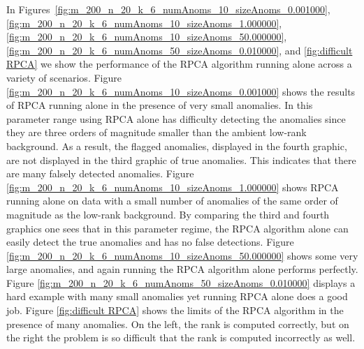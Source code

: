 \documentclass[conference]{IEEEtran}
\begin{document}
In Figures~\ref{fig:m_200_n_20_k_6_numAnoms_10_sizeAnoms_0.001000}, \ref{fig:m_200_n_20_k_6_numAnoms_10_sizeAnoms_1.000000}, \ref{fig:m_200_n_20_k_6_numAnoms_10_sizeAnoms_50.000000},
\ref{fig:m_200_n_20_k_6_numAnoms_50_sizeAnoms_0.010000}, and
\ref{fig:difficult RPCA} we show the performance of the RPCA algorithm running alone across a variety of scenarios. 
Figure \ref{fig:m_200_n_20_k_6_numAnoms_10_sizeAnoms_0.001000} shows the results of RPCA running alone in the presence of very small anomalies.   In this parameter range using RPCA alone has difficulty detecting the anomalies since they are three orders of magnitude smaller than the ambient low-rank background.  As a result, the flagged anomalies, displayed in the fourth graphic, are not displayed in the third graphic of true anomalies. This   indicates that there are many falsely detected anomalies.
Figure \ref{fig:m_200_n_20_k_6_numAnoms_10_sizeAnoms_1.000000} shows RPCA running alone on data with a small number of anomalies of the same order of magnitude as the low-rank background.  By comparing the third and fourth graphics one sees that in this parameter regime, the RPCA algorithm alone can easily detect the true anomalies and has no false detections.  Figure \ref{fig:m_200_n_20_k_6_numAnoms_10_sizeAnoms_50.000000} shows some very large anomalies, and again running the RPCA algorithm alone performs perfectly. Figure \ref {fig:m_200_n_20_k_6_numAnoms_50_sizeAnoms_0.010000} displays a hard example with many small anomalies yet running RPCA alone does a good job.
 Figure \ref{fig:difficult RPCA} shows the limits of the RPCA algorithm in the presence of many anomalies.   On the left, the rank is computed correctly, but on the right the problem is so difficult that the rank is computed incorrectly as well.
 
\end{document}
